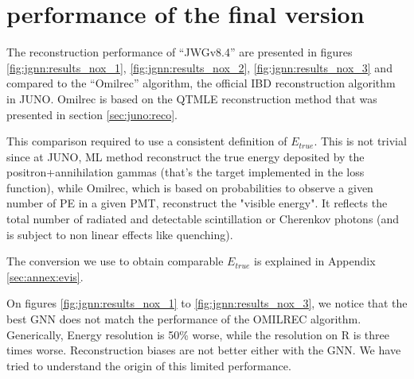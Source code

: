 \documentclass[../main.tex]{subfiles}
\begin{document}
\section{performance of the final version}
\label{sec:jgnn:results}


The reconstruction performance of ``JWGv8.4'' are presented in figures \ref{fig:jgnn:results_nox_1}, \ref{fig:jgnn:results_nox_2}, \ref{fig:jgnn:results_nox_3} and compared to the ``Omilrec'' algorithm, the official IBD reconstruction algorithm in JUNO. Omilrec is based on the QTMLE reconstruction method that was presented in section \ref{sec:juno:reco}.

This comparison required to use a consistent definition of $E_{true}$. This is not trivial since at JUNO, ML method reconstruct the true energy deposited by the positron+annihilation gammas (that's the target implemented in the loss function), while Omilrec, which is based on probabilities to observe a given number of PE in a given PMT, reconstruct the "visible energy". It reflects the total number of radiated and detectable scintillation or Cherenkov photons (and is subject to non linear effects like quenching).

The conversion we use to obtain comparable $E_{true}$ is explained in Appendix \ref{sec:annex:evis}.

On figures \ref{fig:jgnn:results_nox_1} to \ref{fig:jgnn:results_nox_3}, we notice that the best GNN does not match the performance of the OMILREC algorithm. Generically, Energy resolution is 50\% worse, while the resolution on R is three times worse. Reconstruction biases are not better either with the GNN. We have tried to understand the origin of this limited performance.


%
\end{document}
